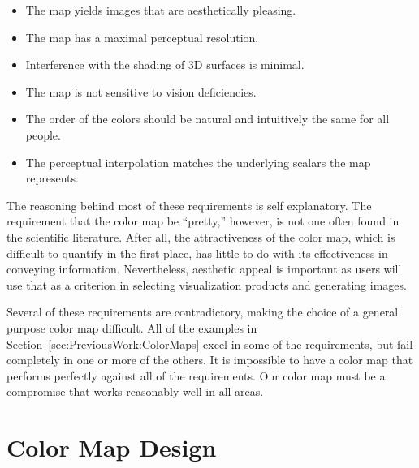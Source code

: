 \documentclass{acmsiggraph}               %
\begin{document}
\begin{itemize}
\item The map yields images that are aesthetically pleasing.
\item The map has a maximal perceptual resolution.
\item Interference with the shading of 3D surfaces is minimal.
\item The map is not sensitive to vision deficiencies.
\item The order of the colors should be natural and intuitively the same
  for all people.
\item The perceptual interpolation matches the underlying scalars the map
  represents.
\end{itemize}

The reasoning behind most of these requirements is self explanatory.  The
requirement that the color map be ``pretty,'' however, is not one often
found in the scientific literature.  After all, the attractiveness of the
color map, which is difficult to quantify in the first place, has little to
do with its effectiveness in conveying information.  Nevertheless, aesthetic
appeal is important as users will use that as a criterion in selecting
visualization products and generating images.


Several of these requirements are contradictory, making the choice of a
general purpose color map difficult.  All of the examples in
Section~\ref{sec:PreviousWork:ColorMaps} excel in some of the requirements,
but fail completely in one or more of the others.  It is impossible to have
a color map that performs perfectly against all of the requirements.  Our color
map must be a compromise that works reasonably well in all areas.


\section{Color Map Design}
\label{sec:ColorMapDesign}
\end{document}
